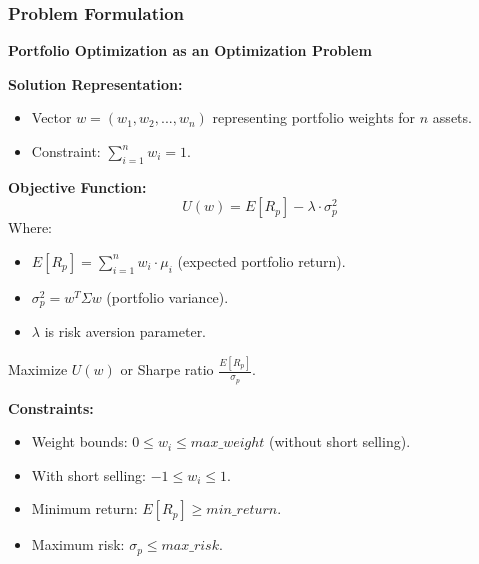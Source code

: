 \documentclass{beamer}
\begin{document}
\begin{frame}
    \frametitle{Problem Formulation}
    \textbf{Portfolio Optimization as an Optimization Problem}

    \textbf{Solution Representation:}
    \begin{itemize}
        \item Vector $w = (w_1, w_2, ..., w_n)$ representing portfolio weights for $n$ assets.
        \item Constraint: $\sum_{i=1}^{n} w_i = 1$.
    \end{itemize}

    \textbf{Objective Function:}
    \[
    U(w) = E[R_p] - \lambda \cdot \sigma_p^2
    \]
    Where:
    \begin{itemize}
        \item $E[R_p] = \sum_{i=1}^{n} w_i \cdot \mu_i$ (expected portfolio return).
        \item $\sigma_p^2 = w^T \Sigma w$ (portfolio variance).
        \item $\lambda$ is risk aversion parameter.
    \end{itemize}
    Maximize $U(w)$ or Sharpe ratio $\frac{E[R_p]}{\sigma_p}$.

    \textbf{Constraints:}
    \begin{itemize}
        \item Weight bounds: $0 \leq w_i \leq max\_weight$ (without short selling).
        \item With short selling: $-1 \leq w_i \leq 1$.
        \item Minimum return: $E[R_p] \geq min\_return$.
        \item Maximum risk: $\sigma_p \leq max\_risk$.
    \end{itemize}
\end{frame}
\end{document}
